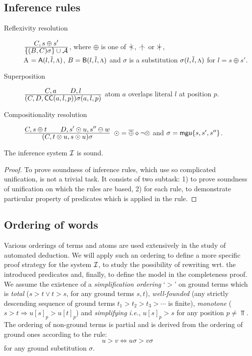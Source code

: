 \subsection{Inference rules}

\begin{description}
\item[Reflexivity resolution]\quad\({\displaystyle C,s\oplus s' \over \displaystyle\{(B,C)\sigma\}\cup \mbox {$\cal A$}}\), 
\quad
where \(\oplus\) is one of \(\notIncl\), \(\notInt\) or \(\notCont\),\\[.5ex]
\C A \(={\sf A}(l,\overline{l},\mbox{\footnotesize$\Lambda$})\),
\(B={\sf B}(l,\overline{l},\mbox{\footnotesize$\Lambda$})\) and
$\sigma$ is a substitution \(\sigma(l,\overline{l},\mbox{\footnotesize$\Lambda$})\) for \(l= s\oplus s'\).

\item[Superposition]\quad \({\displaystyle C,a \qquad D,l \over \displaystyle(C,D,{\sf CC}(a,l,p))\sigma(a,l,p)}\) \quad 
atom \(a\) overlaps literal \(l\) at position $p$.

\item[Compositionality resolution]
\quad \({\displaystyle C,s\oplus t \qquad D,s'\odot u,s''\ominus w \over \displaystyle(C,t\otimes u,s\odot u)\sigma}\) \quad
 \(\odot = \overline{\oplus}\diamond\neg\otimes\) and
\(\sigma={\sf mgu}\{s,s',s''\}\).
\end{description}

\begin{theorem} \label{th:soundness}
The inference system $\mbox {$\cal I$}$ is sound.
\end{theorem}
\begin{proof} 
To prove soundness of inference rules, which use so complicated
unification, is not a trivial task. It consists of two subtask: 1) to prove
soundness of unification on which the rules are based, 2) for each rule, to
demonstrate particular property of predicates which is applied in the rule.
\end{proof}

\subsection{Ordering of words}

Various
orderings of terms and atoms are used extensively in the study of automated
deduction. We will apply such an ordering to define a more specific proof
strategy for the system $\mbox {$\cal I$}$, to study the possibility of rewriting
wrt. the introduced predicates and, finally, to define the model in the
completeness proof. We assume the existence of a {\em simplification
ordering} `$>$' \cite{Der} on ground terms which is {\em total} (\(s>t\lor
t>s\), for any ground terms $s,t$), {\em well-founded} (any strictly
descending sequence of ground terms \(t_1 > t_2 > t_3 > \cdots\) is finite),
{\em monotone} (\(s>t\Rightarrow u[s]_p>u[t]_p\)) and {\em simplifying} {\it
i.e.}, \(u[s]_p>s\) for any position \(p\neq \Top\).  The ordering of
non-ground terms is partial and is derived from the ordering of ground ones
according to the rule:
\begin{equation} \label{eq:ord-non-ground}
u > v \iff u\sigma > v\sigma
\end{equation}
for any ground substitution $\sigma$.

